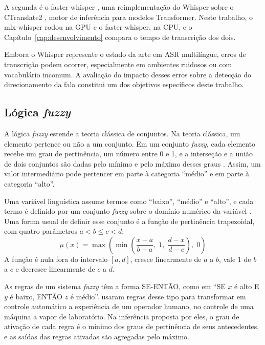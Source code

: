 \documentclass[
    12pt,                %
    openright,           %
    oneside,             %
    a4paper,             %
    english,             %
    brazil               %
]{abntex2}
\begin{document}
A segunda é o faster-whisper \cite{FasterWhisper}, uma reimplementação do Whisper sobre o CTranslate2 \cite{CTranslate2}, motor de inferência para modelos Transformer. Neste trabalho, o mlx-whisper rodou na GPU e o faster-whisper, na CPU, e o Capítulo~\ref{cap:desenvolvimento} compara o tempo de transcrição dos dois.

Embora o Whisper represente o estado da arte em ASR multilíngue, erros de transcrição podem ocorrer, especialmente em ambientes ruidosos ou com vocabulário incomum. A avaliação do impacto desses erros sobre a detecção do direcionamento da fala constitui um dos objetivos específicos deste trabalho.


\subsection{Lógica \textit{fuzzy}}
\label{sec:fuzzy_teoria}

A lógica \textit{fuzzy} estende a teoria clássica de conjuntos. Na teoria clássica, um elemento pertence ou não a um conjunto. Em um conjunto \textit{fuzzy}, cada elemento recebe um grau de pertinência, um número entre 0 e 1, e a interseção e a união de dois conjuntos são dadas pelo mínimo e pelo máximo desses graus \cite{Zadeh1965}. Assim, um valor intermediário pode pertencer em parte à categoria ``médio'' e em parte à categoria ``alto''.

Uma variável linguística assume termos como ``baixo'', ``médio'' e ``alto'', e cada termo é definido por um conjunto \textit{fuzzy} sobre o domínio numérico da variável \cite{Zadeh1975}. Uma forma usual de definir esse conjunto é a função de pertinência trapezoidal, com quatro parâmetros $a < b \leq c < d$:
\[
\mu(x) = \max\left(\min\left(\frac{x-a}{b-a},\; 1,\; \frac{d-x}{d-c}\right),\; 0\right)
\]
A função é nula fora do intervalo $[a, d]$, cresce linearmente de $a$ a $b$, vale 1 de $b$ a $c$ e decresce linearmente de $c$ a $d$.

As regras de um sistema \textit{fuzzy} têm a forma SE-ENTÃO, como em ``SE $x$ é alto E $y$ é baixo, ENTÃO $z$ é médio''.  usaram regras desse tipo para transformar em controle automático a experiência de um operador humano, no controle de uma máquina a vapor de laboratório. Na inferência proposta por eles, o grau de ativação de cada regra é o mínimo dos graus de pertinência de seus antecedentes, e as saídas das regras ativadas são agregadas pelo máximo.
\end{document}
